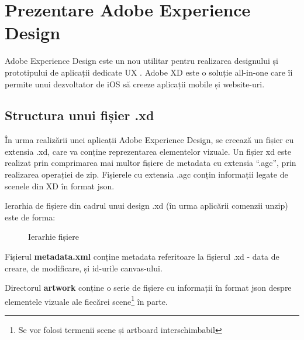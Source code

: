 \section{Prezentare Adobe Experience Design}

Adobe Experience Design este un nou utilitar pentru realizarea designului și prototipului de aplicații dedicate UX \cite{xd}. Adobe XD este o soluție all-in-one care îi permite unui dezvoltator de iOS să creeze aplicații mobile și website-uri. 

\subsection{Structura unui fișier .xd}

În urma realizării unei aplicații Adobe Experience Design, se creează un fișier cu extensia .xd, care va conține reprezentarea elementelor vizuale. 
Un fișier xd este realizat prin comprimarea mai multor fișiere de metadata cu extensia “.agc”, prin realizarea operației de zip. Fișierele cu extensia .agc conțin informații legate de scenele din XD în format json.

Ierarhia de fișiere din cadrul unui design .xd (în urma aplicării comenzii unzip) este de forma:

\begin{figure}[!htbp]
\caption{Ierarhie fișiere} \label{fig:ierarhie}
\end{figure}

Fișierul \textbf{metadata.xml} conține metadata referitoare la fișierul .xd - data de creare, de modificare, și id-urile canvas-ului.

Directorul \textbf{artwork} conține o serie de fișiere cu informații în format json despre elementele vizuale ale fiecărei scene\footnote{Se vor folosi termenii scene și artboard interschimbabil} în parte. 

